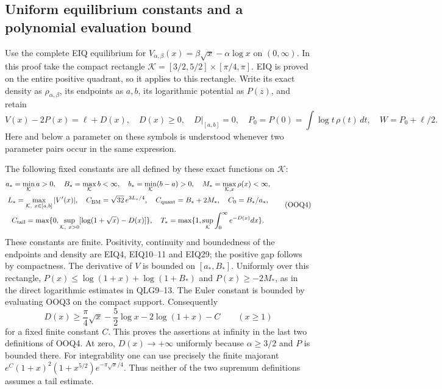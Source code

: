 \documentclass[11pt,a4paper]{article}
\begin{document}
\subsection{Uniform equilibrium constants and a polynomial evaluation bound}

Use the complete EIQ equilibrium for
$V_{\alpha,\beta}(x)=\beta\sqrt x-\alpha\log x$ on $(0,\infty)$.
In this proof take the compact rectangle
$\mathcal K=[3/2,5/2]\times[\pi/4,\pi]$. EIQ is proved on the
entire positive quadrant, so it applies to this rectangle.
Write its exact density as $\rho_{\alpha,\beta}$, its endpoints
as $a,b$, its logarithmic potential as $P(z)$, and retain
\[
 V(x)-2P(x)=\ell+D(x),\quad D(x)\ge0,\quad
 D|_{[a,b]}=0,\quad
 P_0=P(0)=\int\log t\,\rho(t)\,dt,\quad W=P_0+\ell/2.
 \tag{OOQ3}
\]
Here and below a parameter on these symbols is understood whenever
two parameter pairs occur in the same expression.

The following fixed constants are all defined by these exact
functions on $\mathcal K$:
\[
\begin{gathered}
 a_*=\min_{\mathcal K}a>0,\quad B_*=\max_{\mathcal K}b<\infty,
 \quad b_*=\min_{\mathcal K}(b-a)>0,\quad
 M_*=\max_{\mathcal K,x}\rho(x)<\infty,\\
 L_*=\max_{\mathcal K,\ x\in[a,b]}|V'(x)|,\quad
 C_{\rm BM}=\sqrt{32}\,e^{3L_*/4},\quad
 C_{\rm quant}=B_*+2M_*,\quad C_0=B_*/a_*,\\
 C_{\rm tail}=\max\{0,\sup_{\mathcal K,\ x>0}
                    [\log(1+\sqrt x)-D(x)]\},\quad
 T_*=\max\{1,\sup_{\mathcal K}\int_0^\infty e^{-D(x)}dx\}.
\end{gathered}\tag{OOQ4}
\]
These constants are finite. Positivity, continuity and boundedness
of the endpoints and density are EIQ4, EIQ10--11 and EIQ29;
the positive gap follows by compactness. The derivative of $V$
is bounded on $[a_*,B_*]$. Uniformly over this rectangle,
$P(x)\le\log(1+x)+\log(1+B_*)$ and $P(x)\ge-2M_*$, as in
the direct logarithmic estimates in QLG9--13. The Euler constant
is bounded by evaluating OOQ3 on the compact support.
Consequently
\[
 D(x)\ge\frac{\pi}{4}\sqrt x-\frac52\log x
                         -2\log(1+x)-C\qquad(x\ge1)
\]
for a fixed finite constant $C$. This proves the assertions at
infinity in the last two definitions of OOQ4. At zero,
$D(x)\to+\infty$ uniformly because $\alpha\ge3/2$ and $P$
is bounded there. For integrability one can use precisely
the finite majorant
$e^C(1+x)^2(1+x^{5/2})e^{-\pi\sqrt x/4}$.
Thus neither of the two supremum definitions assumes a tail estimate.
\end{document}
